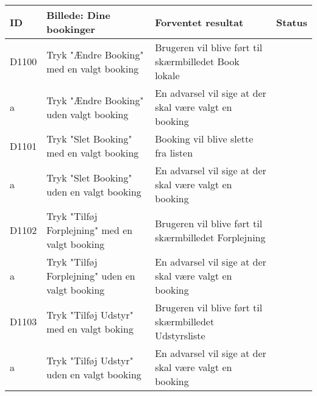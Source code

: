 \begin{tabularx}{\textwidth}{ |X|X|X|X| }
\hline
	ID & Billede: Dine bookinger  & Forventet resultat & Status\\ 
\hline
	D1100 & Tryk "Ændre Booking" med en valgt booking & Brugeren vil blive ført til skærmbilledet Book lokale & \\
\hline
	a & Tryk "Ændre Booking" uden valgt booking & En advarsel vil sige at der skal være valgt en booking & \\
\hline
	D1101 & Tryk "Slet Booking" med en valgt booking & Booking vil blive slette fra listen & \\
\hline
	a & Tryk "Slet Booking" uden en valgt booking & En advarsel vil sige at der skal være valgt en booking & \\
\hline
	D1102 & Tryk "Tilføj Forplejning" med en valgt booking & Brugeren vil blive ført til skærmbilledet Forplejning & \\
\hline
	a &  Tryk "Tilføj Forplejning" uden en valgt booking & En advarsel vil sige at der skal være valgt en booking & \\
\hline
	D1103 & Tryk "Tilføj Udstyr" med en valgt boking & Brugeren vil blive ført til skærmbilledet Udstyrsliste & \\
\hline
	a & Tryk "Tilføj Udstyr" uden en valgt booking & En advarsel vil sige at der skal være valgt en booking & \\
\hline
\end{tabularx}